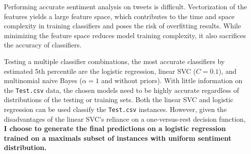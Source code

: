 \documentclass[11pt]{article}
\begin{document}
Performing accurate sentiment analysis on tweets is difficult.
Vectorization of the features yields a large feature space, 
which contributes to the time and space complexity in training classifiers and poses the risk of overfitting results.
While minimizing the feature space reduces model training complexity, it also sacrifices the accuracy of classifiers.

Testing a multiple classifier combinations, 
the most accurate classifiers by estimated 5th percentile are the logistic regression, 
linear SVC ($C=0.1$), and multinomial naive Bayes ($\alpha=1$ and without priors).
With little information on the \texttt{Test.csv} data, 
the chosen models need to be highly accurate regardless of distributions of the testing or training sets.
Both the linear SVC and logistic regression can be used classify the \texttt{Test.csv} instances.
However, given the disadvantages of the linear SVC's reliance on a one-versus-rest decision function,
\textbf{I choose to generate the final predictions on a logistic regression trained on a maximals subset of instances with uniform sentiment distribution.}
\vfill
\pagebreak




\end{document}
